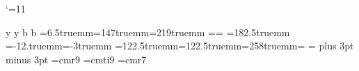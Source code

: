 






\catcode`\@=11
\def\unredoffs{\voffset=13mm \hoffset=6.5truemm}
\def\redoffs{\voffset=-12.truemm\hoffset=-3truemm}
\def\speclscape{\special{landscape}}
\newbox\leftpage \newdimen\fullhsize \newdimen\hstitle \newdimen\hsbody
\newdimen\hdim
\hfuzz=1pt
%
\ifx\hyperdef\UNd@FiNeD{}\fi
\def\newans{y }
\def\answb{y }
\ifx\answb\newans{}%
\def\bigans{b }
\def\answ{b }
\ifx\answ\bigans{}
 \unredoffs\hsize=147truemm\vsize=219truemm
\hsbody=\hsize \hstitle=\hsize %
%
\else{} \let\l@r=L
 \vsize=182.5truemm
\redoffs%
\hstitle=122.5truemm\hsbody=122.5truemm\fullhsize=258truemm\hsize=\hsbody
%
\output={
  \almostshipout{\leftline{\vbox{\makeheadline\pagebody\makefootline}}}
\advancepageno%
}
\def\almostshipout#1{\if L\l@r \count1=1 \message{[\the\count0.\the\count1]}
      \global\setbox\leftpage=#1 \global\let\l@r=R
 \else \count1=2
  \shipout\vbox{\speclscape{\hsize\fullhsize}%
      \hbox to\fullhsize{\box\leftpage\hfil#1}}  \global\let\l@r=L\fi}
\fi
\def\hskipb#1#2{\hdim=#1#2 \multiply \hdim by 8 \divide \hdim by 10 %
\hskip\hdim}
\def\vskipb#1#2{\hdim=#1#2 \multiply \hdim by 8 \divide \hdim by 10 %
\hskip\hdim}
\def\sla#1{\mkern-1.5mu\raise0.4pt\hbox{$\not$}\mkern1.2mu #1\mkern 0.7mu}
\def\Dbar{\mkern-1.5mu\raise0.4pt\hbox{$\not$}\mkern-.1mu {\rm D}\mkern.1mu}
\def\Abar{\mkern1.mu\raise0.4pt\hbox{$\not$}\mkern-1.3mu A\mkern.1mu}
\def\Bbar{\mkern-0.mu\raise0.4pt\hbox{$\not$}\mkern-.3mu B\mkern 0.6mu}
\newskip\tableskipamount \tableskipamount=8pt plus 3pt minus 3pt
\def\tableskip{\vskip\tableskipamount}
\font\elevrm=cmr9 \font\elevit=cmti9 \font\subrm=cmr7
